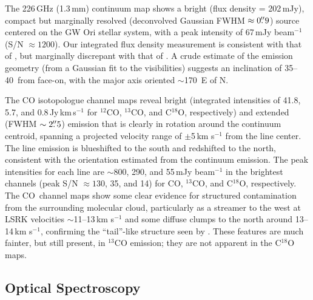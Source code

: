 \documentclass[twocolumn]{aastex61}
\newcommand{\twelve}{CO}
\newcommand{\thirteen}{${}^{13}$CO}
\newcommand{\eighteen}{C${}^{18}$O}
\begin{document}
The 226\,GHz (1.3\,mm) continuum map shows a bright (flux density = 202\,mJy), compact but marginally resolved (deconvolved Gaussian FWHM $\approx 0\mbox{$.\!\!^{\prime\prime}$}9$) source centered on the GW Ori stellar system, with a peak intensity of 67\,mJy beam$^{-1}$ (S/N $\approx 1200$). Our integrated flux density measurement is consistent with that of \citet[$255 \pm 60$\,mJy]{mathieu95},  but marginally discrepant with that of \citet[$320 \pm 64$\,mJy]{fang17}. A crude estimate of the emission geometry (from a Gaussian fit to the visibilities) suggests an inclination of 35--40\degr\ from face-on, with the major axis oriented $\sim$170\degr\ E of N.

The CO isotopologue channel maps reveal bright (integrated intensities of 41.8, 5.7, and 0.8\,Jy\,km\,s$^{-1}$ for $^{12}$CO, $^{13}$CO, and C$^{18}$O, respectively) and extended (FWHM $\sim 2\mbox{$.\!\!^{\prime\prime}$}5$) emission that is clearly in rotation around the continuum centroid, spanning a projected velocity range of $\pm$5\,km s$^{-1}$ from the line center.  The line emission is blueshifted to the south and redshifted to the north, consistent with the orientation estimated from the continuum emission.
The peak intensities for each line are $\sim$800, 290, and 55\,mJy beam$^{-1}$ in the brightest channels (peak S/N $\approx 130$, 35, and 14) for \twelve, \thirteen, and \eighteen, respectively. The \twelve\ channel maps show some clear evidence for structured contamination from the surrounding molecular cloud, particularly as a streamer to the west at LSRK velocities $\sim$11--13\,km s$^{-1}$ and some diffuse clumps to the north around 13--14\,km s$^{-1}$, confirming the ``tail''-like structure seen by \citet{fang17}.  These features are much fainter, but still present, in $^{13}$CO emission; they are not apparent in the C$^{18}$O maps.

\subsection{Optical Spectroscopy \label{subsec:spectroscopy}}
\end{document}
